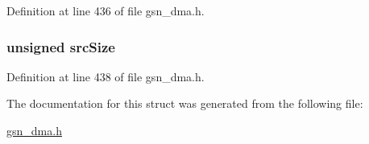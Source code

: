 Definition at line 436 of file gsn\_\-dma.h.

\hypertarget{a00010_afce65d7ab2f64da1bc1b369379fb5e67}{
\subsubsection[{srcSize}]{\setlength{\rightskip}{0pt plus 5cm}unsigned {\bf srcSize}}}
\label{a00010_afce65d7ab2f64da1bc1b369379fb5e67}


Definition at line 438 of file gsn\_\-dma.h.



The documentation for this struct was generated from the following file:\begin{DoxyCompactItemize}
\item 
\hyperlink{a00484}{gsn\_\-dma.h}\end{DoxyCompactItemize}
